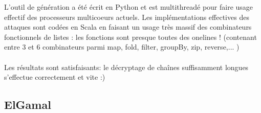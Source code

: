 \documentclass[11pt]{article} %
\begin{document}
  L'outil de génération a été écrit en Python et est multithreadé pour faire usage effectif des processeurs multicoeurs actuels. Les implémentations effectives des attaques sont codées en Scala en faisant un usage très massif des combinateurs fonctionnels de listes : les fonctions sont presque toutes des onelines ! (contenant entre 3 et 6 combinateurs parmi map, fold, filter, groupBy, zip, reverse,... )\\\\

  Les résultats sont satisfaisants: le décryptage de chaînes suffisamment longues s'effectue correctement et vite :) 
\subsection{ElGamal}
\end{document}
